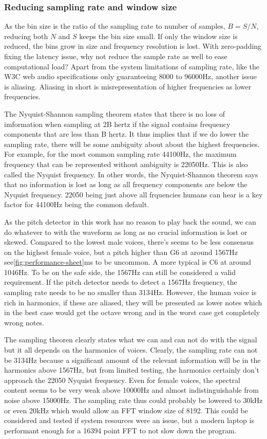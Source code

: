 \subsubsection{Reducing sampling rate and window size}
As the bin size is the ratio of the sampling rate to number of samples, $B = S/N$, reducing both $N$ and $S$ keeps the bin size small. If only the window size is reduced, the bins grow in size and frequency resolution is lost. With zero-padding fixing the latency issue, why not reduce the sample rate as well to ease computational load? Apart from the system limitations of sampling rate, like the W3C web audio specifications only guaranteeing 8000 to 96000Hz, another issue is aliasing. Aliasing in short is misrepresentation of higher frequencies as lower frequencies. 

The Nyquist-Shannon sampling theorem states that there is no loss of imformation when sampling at 2B hertz if the signal contains frequency components that are less than B hertz. It thus implies that if we do lower the sampling rate, there will be some ambiguity about about the highest frequencies. For example, for the most common sampling rate 44100Hz, the maximum frequency that can be represented without ambiguity is 22050Hz. This is also called the Nyquist frequency. In other words, the Nyquist-Shannon theorem says that no information is lost as long as all frequency components are below the Nyquist frequency. 22050 being just above all frquencies humans can hear is a key factor for 44100Hz being the common default. 

As the pitch detector in this work has no reason to play back the sound, we can do whatever to with the waveform as long as no crucial information is lost or skewed. Compared to the lowest male voices, there's seems to be less consensus on the highest female voice, but a pitch higher than G6 at around 1567Hz see\ref{fig:performance-sheet}ms to be uncommon. A more typical is C6 at around 1046Hz. To be on the safe side, the 1567Hz can still be considered a valid requirement. If the pitch detector needs to detect a 1567Hz frequency, the sampling rate needs to be no smaller than 3134Hz. However, the human voice is rich in harmonics, if these are aliased, they will be presented as lower notes which in the best case would get the octave wrong and in the worst case get completely wrong notes.

The sampling theoren clearly states what we can and can not do with the signal but it all depends on the harmonics of voices. Clearly, the sampling rate can not be 3134Hz because a significant amount of the relevant information will be in the harmonics above 1567Hz, but from limited testing, the harmonics certainly don't approach the 22050 Nyquist frequency.  Even for female voices, the spectral content seems to be very weak above 10000Hz and almost indistinguishable from noise above 15000Hz. The sampling rate thus could probably be lowered to 30kHz or even 20kHz which would allow an FFT window size of 8192. This could be considered and tested if system resources were an issue, but a modern laptop is performant enough for a 16394 point FFT to not slow down the program.

